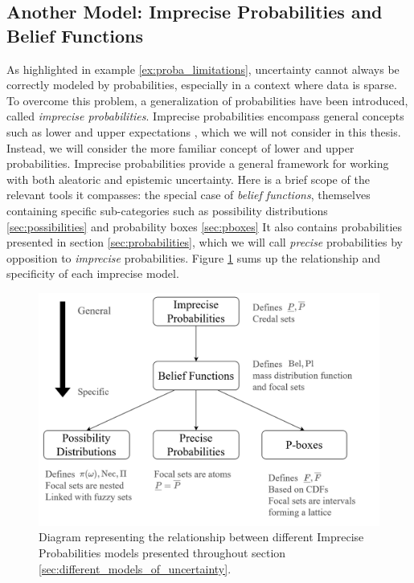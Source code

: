 \subsection{Another Model: Imprecise Probabilities and Belief Functions}\label{sec:imprecise_probabilities}
As highlighted in example \ref{ex:proba_limitations}, uncertainty cannot always be correctly modeled by probabilities, especially in a context where data is sparse. To overcome this problem, a generalization of probabilities have been introduced, called \textit{imprecise probabilities}. Imprecise probabilities encompass general concepts such as lower and upper expectations \cite{walley_statistical_1991,augustin_introduction_2014}, which we will not consider in this thesis. Instead, we will consider the more familiar concept of lower and upper probabilities. Imprecise probabilities provide a general framework for working with both aleatoric and epistemic uncertainty. Here is a brief scope of the relevant tools it compasses: the special case of \textit{belief functions}, themselves containing specific sub-categories such as possibility distributions \ref{sec:possibilities} and probability boxes \ref{sec:pboxes} \etc It also contains probabilities presented in section \ref{sec:probabilities}, which we will call \textit{precise} probabilities by opposition to \textit{imprecise} probabilities. Figure \ref{fig:diagram_IP} sums up the relationship and specificity of each imprecise model.

\begin{figure}[hb]
    {\centering
    \includegraphics[width=\linewidth]{Images/Diagramme_IP_Bel.png}
    \caption{Diagram representing the relationship between different Imprecise Probabilities models presented throughout section \ref{sec:different_models_of_uncertainty}.}
    \label{fig:diagram_IP}}
\end{figure}

